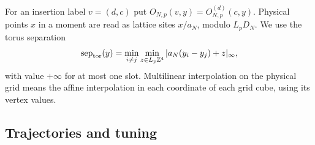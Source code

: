 For an insertion label $v=(d,c)$ put $O_{N,p}(v,y)=O^{(d)}_{N,p}(c,y)$. Physical points $x$ in a moment are read as lattice sites $x/a_N$, modulo $L_pD_N$. We use the torus separation
\begin{equation*}
\operatorname{sep}_{\rm tor}(y)=\min_{i\ne j}\min_{z\in L_p\mathbb{Z}^4}
|a_N(y_i-y_j)+z|_\infty,
\end{equation*}
with value $+\infty$ for at most one slot. Multilinear interpolation on the physical grid means the affine interpolation in each coordinate of each grid cube, using its vertex values.

\subsection{Trajectories and tuning}\label{sec:partII-E.1}

